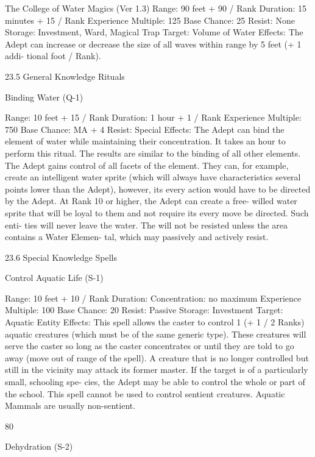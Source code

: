 \begin{Chapter}{The College of Water Magics (Ver 1.3)}
Range: 90 feet + 90 / Rank 
Duration: 15 minutes + 15 / Rank 
Experience Multiple: 125 
Base Chance: 25%
Resist: None 
Storage: Investment, Ward, Magical Trap 
Target: Volume of Water 
Effects:  The  Adept  can  increase  or  decrease  the 
size of all  waves  within range by 5 feet (+ 1 addi-
tional foot / Rank). 

23.5 General Knowledge Rituals 

Binding Water (Q-1) 

Range: 10 feet + 15 / Rank 
Duration: 1 hour + 1 / Rank 
Experience Multiple: 750 
Base Chance: MA + 4%
Resist: Special 
Effects:  The  Adept  can  bind  the  element  of  water 
while  maintaining  their  concentration.  It  takes  an 
hour  to  perform  this  ritual.  The  results  are  similar 
to  the  binding  of  all  other  elements.  The  Adept 
gains control of all facets of the element. They can, 
for  example,  create  an  intelligent  water  sprite 
(which  will  always  have  characteristics  several 
points  lower  than  the  Adept),  however,  its  every 
action would have to be directed by the Adept. At 
Rank  10  or  higher,  the  Adept  can  create  a  free-
willed  water  sprite  that  will  be  loyal  to  them  and 
not  require  its  every  move  be  directed.  Such  enti-
ties  will  never  leave  the  water.  The  will  not  be 
resisted  unless  the  area  contains  a  Water  Elemen-
tal, which may passively and actively resist. 

23.6 Special Knowledge Spells 

Control Aquatic Life (S-1) 

Range: 10 feet + 10 / Rank 
Duration: Concentration: no maximum 
Experience Multiple: 100 
Base Chance: 20%
Resist: Passive 
Storage: Investment 
Target: Aquatic Entity 
Effects: This spell allows the caster to control 1 (+ 
1  /  2  Ranks)  aquatic  creatures  (which  must  be  of 
the  same  generic  type).  These  creatures  will  serve 
the caster so long as the caster concentrates or until 
they are told to go away (move out of range of the 
spell).  A  creature  that  is  no  longer  controlled  but 
still in the vicinity may attack its former master. If 
the target is of a particularly small, schooling spe-
cies, the Adept may be able to control the whole or 
part  of  the  school.  This  spell  cannot  be  used  to 
control  sentient  creatures.  Aquatic  Mammals  are 
usually non-sentient. 

80 

Dehydration (S-2) 


\end{Chapter}
